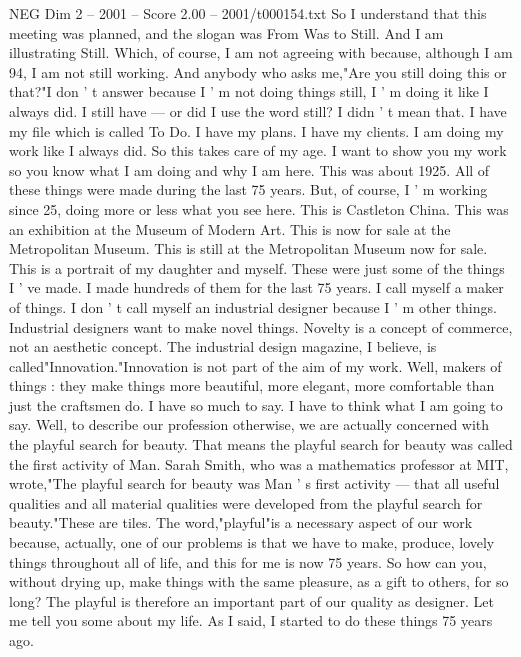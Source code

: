 \begin{textsample}{NEG Dim 2 – 2001 – Score 2.00 – 2001/t000154.txt}  \label{ex:f2_neg_057}
So I understand that this meeting was planned, and the slogan was From Was to Still.
And I am illustrating Still.
Which, of course, I am not agreeing with because, although I am 94, I am not still working.
And anybody who asks me,"Are you still doing this or that?"I don ' t answer because I ' m not doing things still, I ' m doing it like I always did.
I still have — or did I use the word still?
I didn ' t mean that.
I have my file which is called To Do.
I have my plans.
I have my clients.
I am doing my work like I always did.
So this takes care of my age.
I want to show you my work so you know what I am doing and why I am here.
This was about 1925.
All of these things were made during the last 75 years.
But, of course, I ' m working since 25, doing more or less what you see here.
This is Castleton China.
This was an exhibition at the Museum of Modern Art.
This is now for sale at the Metropolitan Museum.
This is still at the Metropolitan Museum now for sale.
This is a portrait of my daughter and myself.
These were just some of the things I ' ve made.
I made hundreds of them for the last 75 years.
I call myself a maker of things.
I don ' t call myself an industrial designer because I ' m other things.
Industrial designers want to make novel things.
Novelty is a concept of commerce, not an aesthetic concept.
The industrial design magazine, I believe, is called"Innovation."Innovation is not part of the aim of my work.
Well, makers of things : they make things more beautiful, more elegant, more comfortable than just the craftsmen do.
I have so much to say.
I have to think what I am going to say.
Well, to describe our profession otherwise, we are actually concerned with the playful search for beauty.
That means the playful search for beauty was called the first activity of Man.
Sarah Smith, who was a mathematics professor at MIT, wrote,"The playful search for beauty was Man ' s first activity — that all useful qualities and all material qualities were developed from the playful search for beauty."These are tiles.
The word,"playful"is a necessary aspect of our work because, actually, one of our problems is that we have to make, produce, lovely things throughout all of life, and this for me is now 75 years.
So how can you, without drying up, make things with the same pleasure, as a gift to others, for so long?
The playful is therefore an important part of our quality as designer.
Let me tell you some about my life.
As I said, I started to do these things 75 years ago.

\end{textsample}
